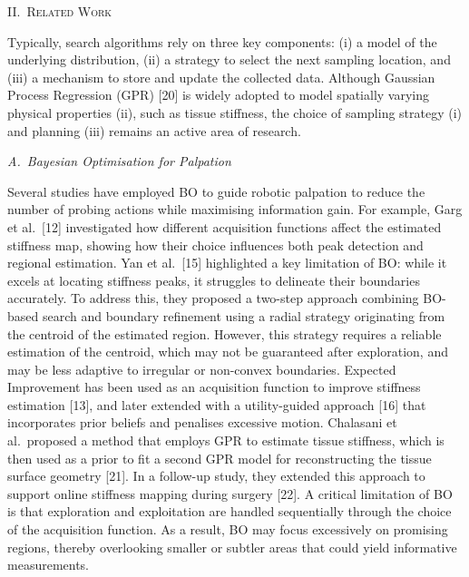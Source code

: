 \documentclass[11pt]{article}
\begin{document}
\vspace{0.8em}

\begin{center}
\textsc{II.\ Related Work}
\end{center}

\noindent
Typically, search algorithms rely on three key components: (i) a
model of the underlying distribution, (ii) a strategy to select the
next sampling location, and (iii) a mechanism to store and update the
collected data. Although Gaussian Process Regression (GPR) [20] is
widely adopted to model spatially varying physical properties (ii),
such as tissue stiffness, the choice of sampling strategy (i) and
planning (iii) remains an active area of research.

\vspace{0.4em}

\noindent\textit{A.~Bayesian Optimisation for Palpation}

\vspace{0.2em}

\noindent
Several studies have employed BO to guide robotic palpation to
reduce the number of probing actions while maximising information
gain. For example, Garg et al.\ [12] investigated how different
acquisition functions affect the estimated stiffness map, showing how
their choice influences both peak detection and regional estimation.
Yan et al.\ [15] highlighted a key limitation of BO: while it excels
at locating stiffness peaks, it struggles to delineate their
boundaries accurately. To address this, they proposed a two-step
approach combining BO-based search and boundary refinement using a
radial strategy originating from the centroid of the estimated
region. However, this strategy requires a reliable estimation of the
centroid, which may not be guaranteed after exploration, and may be
less adaptive to irregular or non-convex boundaries. Expected
Improvement has been used as an acquisition function to improve
stiffness estimation [13], and later extended with a utility-guided
approach [16] that incorporates prior beliefs and penalises excessive
motion. Chalasani et al.\ proposed a method that employs GPR to
estimate tissue stiffness, which is then used as a prior to fit a
second GPR model for reconstructing the tissue surface geometry [21].
In a follow-up study, they extended this approach to support online
stiffness mapping during surgery [22]. A critical limitation of BO is
that exploration and exploitation are handled sequentially through
the choice of the acquisition function. As a result, BO may focus
excessively on promising regions, thereby overlooking smaller or
subtler areas that could yield informative measurements.
\end{document}
